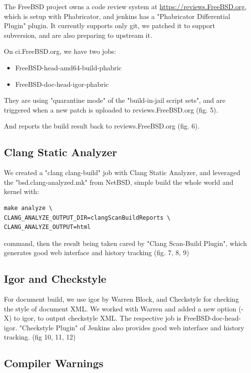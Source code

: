 \documentclass[a4paper,twocolumn,10pt]{article}
\begin{document}
The FreeBSD project owns a code review system at \url{https://reviews.FreeBSD.org},
which is setup with Phabricator, and jenkins has a "Phabricator Differential
Plugin" plugin. It currently supports only git, we patched it to support
subversion, and are also preparing to upstream it.

On ci.FreeBSD.org, we have two jobs:

\begin{itemize}
\item FreeBSD-head-amd64-build-phabric
\item FreeBSD-doc-head-igor-phabric
\end{itemize}

They are using "quarantine mode" of the "build-in-jail script sets", and are
triggered when a new patch is uploaded to reviews.FreeBSD.org (fig. 5).

And reports the build result back to reviews.FreeBSD.org (fig. 6).

\subsection{Clang Static Analyzer}

We created a "clang clang-build" job with Clang Static Analyzer, and leveraged
the "bsd.clang-analyzed.mk" from NetBSD, simple build the whole world and
kernel with:

\begin{lstlisting}
make analyze \
CLANG_ANALYZE_OUTPUT_DIR=clangScanBuildReports \
CLANG_ANALYZE_OUTPUT=html
\end{lstlisting}

command, then the result being taken cared by "Clang Scan-Build Plugin", which generates good web interface and history tracking (fig. 7, 8, 9)

\subsection{Igor and Checkstyle}

For document build, we use igor by Warren Block, and Checkstyle for checking
the style of document XML. We worked with Warren and added a new option (-X) to
igor, to output checkstyle XML. The respective job is FreeBSD-doc-head-igor.
"Checkstyle Plugin" of Jenkins also provides good web interface and history
tracking. (fig 10, 11, 12)

\subsection{Compiler Warnings}
\end{document}
